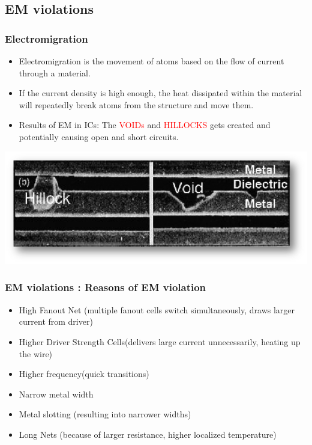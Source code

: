 \documentclass[compress]{beamer}
\begin{document}
\subsection[EM]{EM violations}
\begin{frame}
	\frametitle{Electromigration}
		\begin{itemize}
			\item  Electromigration is the movement of atoms based on the flow of current through a material. 
			\item If the current density is high enough, the heat dissipated within the material will repeatedly break atoms from the structure and move them.
			\item Results of EM in ICs: The \textcolor{red}{VOIDs} and \textcolor{red}{HILLOCKS} gets created and potentially
			causing open and short circuits.
		\end{itemize}
	\begin{center}
		\includegraphics[width=\textwidth]{EM}
	\end{center}
\end{frame}
\begin{frame}
	\frametitle{EM violations : Reasons of EM violation}
	\begin{itemize}
		\item High Fanout Net (multiple fanout cells switch simultaneously, draws larger
		current from driver)
		\item Higher Driver Strength Cells(delivers large current unnecessarily, heating up the wire)
		\item Higher frequency(quick transitions)
		\item Narrow metal width
		\item Metal slotting (resulting into narrower widths)
		\item Long Nets (because of larger resistance, higher localized temperature)
	\end{itemize}
\end{frame}
\end{document}
